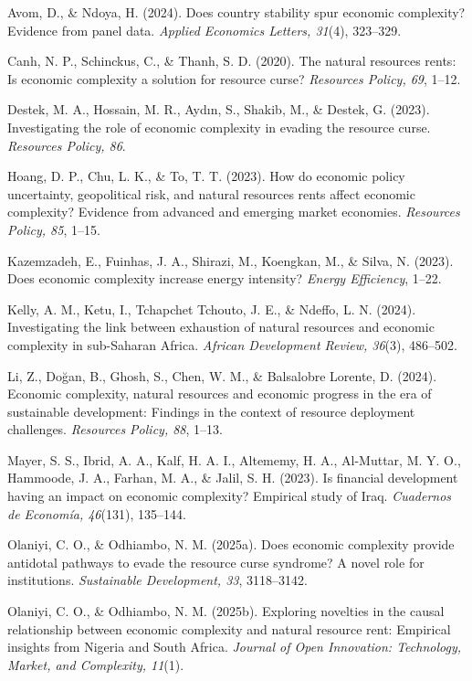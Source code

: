 \documentclass[12pt,a4paper]{article}
\begin{document}
\hangindent=1.27cm
Avom, D., \& Ndoya, H. (2024). Does country stability spur economic complexity? Evidence from panel data. \textit{Applied Economics Letters, 31}(4), 323--329.

\hangindent=1.27cm
Canh, N. P., Schinckus, C., \& Thanh, S. D. (2020). The natural resources rents: Is economic complexity a solution for resource curse? \textit{Resources Policy, 69}, 1--12.

\hangindent=1.27cm
Destek, M. A., Hossain, M. R., Aydın, S., Shakib, M., \& Destek, G. (2023). Investigating the role of economic complexity in evading the resource curse. \textit{Resources Policy, 86}.

\hangindent=1.27cm
Hoang, D. P., Chu, L. K., \& To, T. T. (2023). How do economic policy uncertainty, geopolitical risk, and natural resources rents affect economic complexity? Evidence from advanced and emerging market economies. \textit{Resources Policy, 85}, 1--15.

\hangindent=1.27cm
Kazemzadeh, E., Fuinhas, J. A., Shirazi, M., Koengkan, M., \& Silva, N. (2023). Does economic complexity increase energy intensity? \textit{Energy Efficiency}, 1--22.

\hangindent=1.27cm
Kelly, A. M., Ketu, I., Tchapchet Tchouto, J. E., \& Ndeffo, L. N. (2024). Investigating the link between exhaustion of natural resources and economic complexity in sub-Saharan Africa. \textit{African Development Review, 36}(3), 486--502.

\hangindent=1.27cm
Li, Z., Doğan, B., Ghosh, S., Chen, W. M., \& Balsalobre Lorente, D. (2024). Economic complexity, natural resources and economic progress in the era of sustainable development: Findings in the context of resource deployment challenges. \textit{Resources Policy, 88}, 1--13.

\hangindent=1.27cm
Mayer, S. S., Ibrid, A. A., Kalf, H. A. I., Altememy, H. A., Al-Muttar, M. Y. O., Hammoode, J. A., Farhan, M. A., \& Jalil, S. H. (2023). Is financial development having an impact on economic complexity? Empirical study of Iraq. \textit{Cuadernos de Economía, 46}(131), 135--144.

\hangindent=1.27cm
Olaniyi, C. O., \& Odhiambo, N. M. (2025a). Does economic complexity provide antidotal pathways to evade the resource curse syndrome? A novel role for institutions. \textit{Sustainable Development, 33}, 3118--3142.

\hangindent=1.27cm
Olaniyi, C. O., \& Odhiambo, N. M. (2025b). Exploring novelties in the causal relationship between economic complexity and natural resource rent: Empirical insights from Nigeria and South Africa. \textit{Journal of Open Innovation: Technology, Market, and Complexity, 11}(1).
\end{document}
